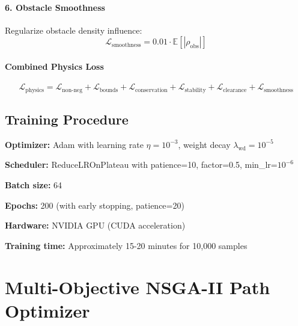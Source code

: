 \paragraph{6. Obstacle Smoothness}
Regularize obstacle density influence:
\begin{equation}
\mathcal{L}_{\text{smoothness}} = 0.01 \cdot \mathbb{E}\left[ |\rho_{\text{obs}}| \right]
\label{eq:loss_smoothness}
\end{equation}

\paragraph{Combined Physics Loss}
\begin{equation}
\mathcal{L}_{\text{physics}} = \mathcal{L}_{\text{non-neg}} + \mathcal{L}_{\text{bounds}} + \mathcal{L}_{\text{conservation}} + \mathcal{L}_{\text{stability}} + \mathcal{L}_{\text{clearance}} + \mathcal{L}_{\text{smoothness}}
\label{eq:physics_loss_combined}
\end{equation}

\subsection{Training Procedure}

\textbf{Optimizer:} Adam with learning rate $\eta = 10^{-3}$, weight decay $\lambda_{\text{wd}} = 10^{-5}$

\textbf{Scheduler:} ReduceLROnPlateau with patience=10, factor=0.5, min\_lr=$10^{-6}$

\textbf{Batch size:} 64

\textbf{Epochs:} 200 (with early stopping, patience=20)

\textbf{Hardware:} NVIDIA GPU (CUDA acceleration)

\textbf{Training time:} Approximately 15-20 minutes for 10,000 samples




\section{Multi-Objective NSGA-II Path Optimizer}
\label{sec:meth_optimizer}

